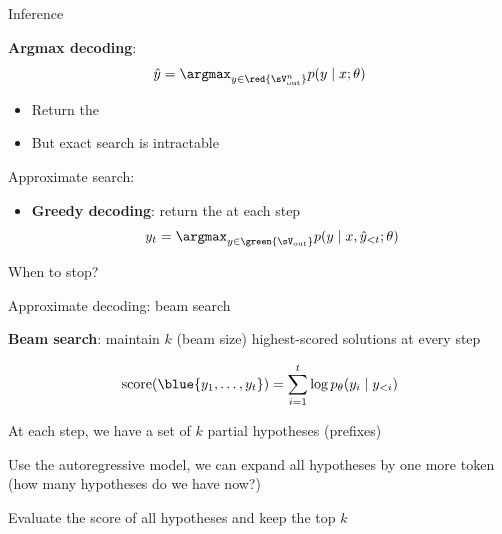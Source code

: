 \documentclass[usenames,dvipsnames,notes,11pt,aspectratio=169,hyperref={colorlinks=true, linkcolor=blue}]{beamer}
\newcommand{\pdfnote}[1]{}
\begin{document}
\begin{frame}
    {Inference}

    \textbf{Argmax decoding}: 
    $$
    \hat{y} = \argmax_{y\in\red{\sV_{\text{out}}^n}} p(y\mid x; \theta)
    $$
    \vspace{-1em}
    \begin{itemize}
        \item Return the 
        \item But exact search is intractable 
    \end{itemize}

    \pause
    Approximate search:\\
    \begin{itemize}
        \item \textbf{Greedy decoding}: return the  at each step
            $$
            y_t = \argmax_{y\in\green{\sV_{\text{out}}}} p(y\mid x, \hat{y}_{<t}; \theta)
            $$
    \end{itemize}

    When to stop?
\end{frame}

\begin{frame}
    {Approximate decoding: beam search}

    \textbf{Beam search}: maintain $k$ (beam size) highest-scored  solutions at every step 

    $$
    \mathrm{score}(\blue{y_1,\ldots,y_t}) = \sum_{i=1}^t \log p_\theta(y_i\mid y_{<i})
    $$
    
    \pdfnote{
        At each step, we want to find the partial sequence with the highest score.
        At the end, we would have the highest scoring complete sequence.
        But isn't this more expensive?
        We need to use DP here by reusing previous result.
        By chain rule, at each step, we can reuse previous compute.
        But still, this isn't saving us much compute, because we are still enumerating the score of all sequences.
        The main trick in beam search is to reduce the search space at each step to a constant number, i.e. the beam size.
        Basically, we only save the top-k partial sequences at each step.
    }

    \begin{wideitemize}
        \item At each step, we have a set of $k$ partial hypotheses (prefixes)
        \item Use the autoregressive model, we can expand all hypotheses by one more token (how many hypotheses do we have now?)
        \item Evaluate the score of all hypotheses and keep the top $k$
    \end{wideitemize}
\end{frame}
\end{document}
